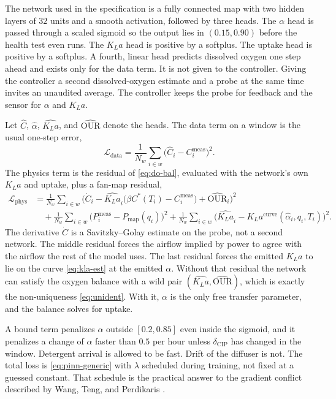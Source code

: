 The network used in the specification is a fully connected map with two hidden layers of $32$ units and a smooth activation, followed by three heads. The $\alpha$ head is passed through a scaled sigmoid so the output lies in $(0.15,0.90)$ before the health test even runs. The $K_La$ head is positive by a softplus. The uptake head is positive by a softplus. A fourth, linear head predicts dissolved oxygen one step ahead and exists only for the data term. It is not given to the controller. Giving the controller a second dissolved-oxygen estimate and a probe at the same time invites an unaudited average. The controller keeps the probe for feedback and the sensor for $\alpha$ and $K_La$.

Let $\hat{C}$, $\hat{\alpha}$, $\widehat{K_La}$, and $\widehat{\mathrm{OUR}}$ denote the heads. The data term on a window is the usual one-step error,
\begin{equation}
\label{eq:ldata}
\mathcal{L}_{\mathrm{data}}
=
\frac{1}{N_{w}}
\sum_{i\in w}
\big(\hat{C}_{i}-C^{\mathrm{meas}}_{i}\big)^{2}.
\end{equation}
The physics term is the residual of \eqref{eq:do-bal}, evaluated with the network's own $K_La$ and uptake, plus a fan-map residual,
\begin{equation}
\label{eq:lphys}
\begin{aligned}
\mathcal{L}_{\mathrm{phys}}
&=
\frac{1}{N_{w}}
\sum_{i\in w}
\Big(
\dot{C}_{i}
-
\widehat{K_La}_{i}\big(\beta C^{*}(T_{i})-C^{\mathrm{meas}}_{i}\big)
+
\widehat{\mathrm{OUR}}_{i}
\Big)^{2}
\\
&\quad
+
\frac{1}{N_{w}}
\sum_{i\in w}
\big(
P^{\mathrm{meas}}_{i}
-
P_{\mathrm{map}}(q_{i})
\big)^{2}
+
\frac{1}{N_{w}}
\sum_{i\in w}
\big(
\widehat{K_La}_{i}
-
K_La^{\mathrm{curve}}(\hat{\alpha}_{i},q_{i},T_{i})
\big)^{2}.
\end{aligned}
\end{equation}
The derivative $\dot{C}$ is a Savitzky--Golay estimate on the probe, not a second network. The middle residual forces the airflow implied by power to agree with the airflow the rest of the model uses. The last residual forces the emitted $K_La$ to lie on the curve \eqref{eq:kla-est} at the emitted $\alpha$. Without that residual the network can satisfy the oxygen balance with a wild pair $(\widehat{K_La},\widehat{\mathrm{OUR}})$, which is exactly the non-uniqueness \eqref{eq:unident}. With it, $\alpha$ is the only free transfer parameter, and the balance solves for uptake.

A bound term penalizes $\alpha$ outside $[0.2,0.85]$ even inside the sigmoid, and it penalizes a change of $\alpha$ faster than $0.5$ per hour unless $\delta_{\mathrm{CIP}}$ has changed in the window. Detergent arrival is allowed to be fast. Drift of the diffuser is not. The total loss is \eqref{eq:pinn-generic} with $\lambda$ scheduled during training, not fixed at a guessed constant. That schedule is the practical answer to the gradient conflict described by Wang, Teng, and Perdikaris \cite{wang2021gradient,raissi2019pinn,cuomo2022}.

